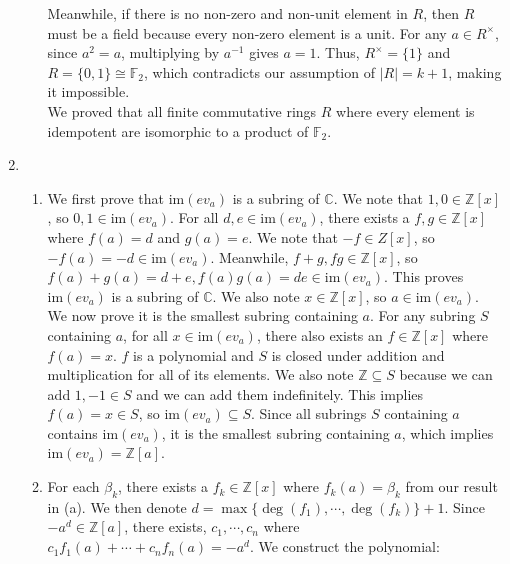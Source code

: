 \documentclass{article}
\begin{document}
\begin{enumerate}
\begin{enumerate}
    Meanwhile, if there is no non-zero and non-unit element in $R$, then $R$ must be a field because every non-zero element is a unit. For any $a \in R^{\times}$, since $a^2=a$, multiplying by $a^{-1}$ gives $a=1$. Thus, $R^{\times}=\{1\}$ and $R=\{0,1\}\cong\mathbb{F}_2$, which contradicts our assumption of $|R| = k + 1$, making it impossible. \\

    We proved that all finite commutative rings $R$ where every element is idempotent are isomorphic to a product of $\mathbb{F}_2$.

    
\end{enumerate}

\newpage

\item
\begin{enumerate}
    \item 
    We first prove that $\text{im}(ev_a)$ is a subring of $\mathbb{C}$. We note that $1, 0 \in \mathbb{Z}[x]$, so $0, 1 \in \text{im}(ev_a)$. For all $d,e \in \text{im}(ev_a)$, there exists a $f, g \in \mathbb{Z}[x]$ where $f(a) = d$ and $g(a) = e$. We note that $-f \in Z[x]$, so $-f(a) = -d \in \text{im}(ev_a)$. Meanwhile, $f + g, fg \in \mathbb{Z}[x]$, so $f(a) + g(a) = d + e, f(a)g(a) = de \in \text{im}(ev_a)$. This proves $\text{im}(ev_a)$ is a subring of $\mathbb{C}$. We also note $x \in \mathbb{Z}[x]$, so $a \in \text{im}(ev_a)$.\\

    We now prove it is the smallest subring containing $a$. For any subring $S$ containing $a$, for all $x \in \text{im}(ev_a)$, there also exists an $f \in \mathbb{Z}[x]$ where $f(a) = x$. $f$ is a polynomial and $S$ is closed under addition and multiplication for all of its elements. We also note $\mathbb{Z} \subseteq S$ because we can add $1, -1 \in S$ and we can add them indefinitely. This implies $f(a) = x \in S$, so $\text{im}(ev_a) \subseteq S$. Since all subrings $S$ containing $a$ contains $\text{im}(ev_a)$, it is the smallest subring containing $a$, which implies $\text{im}(ev_a) = \mathbb{Z}[a]$. \\

    \item 
    For each $\beta_k$, there exists a $f_k \in \mathbb{Z}[x]$ where $f_k(a) = \beta_k$ from our result in (a). We then denote $d = \max\{ \deg(f_1), \cdots , \deg(f_k) \} + 1$. Since $-a^d \in \mathbb{Z}[a]$, there exists, $c_1, \cdots, c_n$ where $c_1f_1(a) + \cdots + c_n f_n(a) = -a^d $. We construct the polynomial: 


\end{enumerate}
\end{enumerate}
\end{document}
